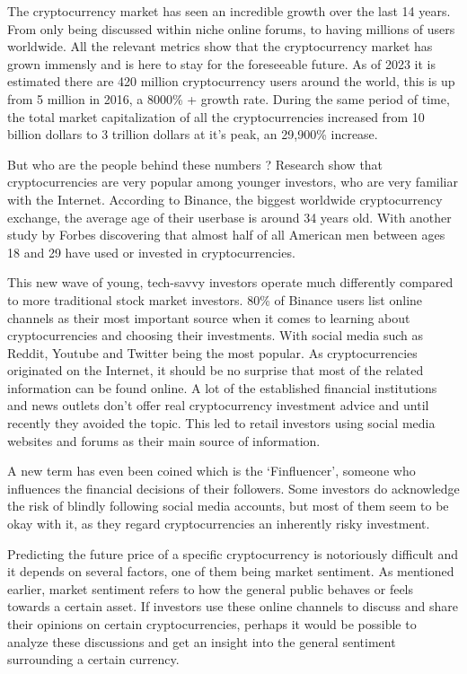 The cryptocurrency market has seen an incredible growth over the last 14 years. From only being discussed within niche online forums, to having millions of users worldwide. All the relevant metrics show that the cryptocurrency market has grown immensly and is here to stay for the foreseeable future. As of 2023 it is estimated there are 420 million cryptocurrency users around the world, this is up from 5 million in 2016, a 8000\% + growth rate\autocite{DeBest2023}. During the same period of time, the total market capitalization of all the cryptocurrencies increased from 10 billion dollars to 3 trillion dollars at it’s peak, an 29,900\% increase. \autocite{Coingecko2023b} \bigbreak

But who are the people behind these numbers ? Research show that cryptocurrencies are very popular among younger investors, who are very familiar with the Internet. According to Binance, the biggest worldwide cryptocurrency exchange\autocite{Coinmarketcap2023}, the average age of their userbase is around 34 years old\autocite{Binance2021}. With another study by Forbes discovering that almost half of all American men between ages 18 and 29 have used or invested in cryptocurrencies.\autocite{Delatto2022} \bigbreak 

This new wave of young, tech-savvy investors operate much differently compared to more traditional stock market investors. 80\% of Binance users list online channels as their most important source when it comes to learning about cryptocurrencies and choosing their investments. With social media such as Reddit, Youtube and Twitter being the most popular\autocite{Binance2021}. As cryptocurrencies originated on the Internet, it should be no surprise that most of the related information can be found online. A lot of the established financial institutions and news outlets don’t offer real cryptocurrency investment advice and until recently they avoided the topic. This led to retail investors using social media websites and forums as their main source of information. \autocite{Binance2021} \autocite{Magnusson2022}  \bigbreak

A new term has even been coined which is the ‘Finfluencer’, someone who influences the financial decisions of their followers\autocite{CambridgeWords2021}. Some investors do acknowledge the risk of blindly following social media accounts, but most of them seem to be okay with it, as they regard cryptocurrencies an inherently risky investment.\autocite{Magnusson2022} \bigbreak 
 
Predicting the future price of a specific cryptocurrency is notoriously difficult and it depends on several factors, one of them being market sentiment\autocite{Lewis2018a}. As mentioned earlier, market sentiment refers to how the general public behaves or feels towards a certain asset\autocite{Smith2022}. If investors use these online channels to discuss and share their opinions on certain cryptocurrencies, perhaps it would be possible to analyze these discussions and get an insight into the general sentiment surrounding a certain currency. \bigbreak 

